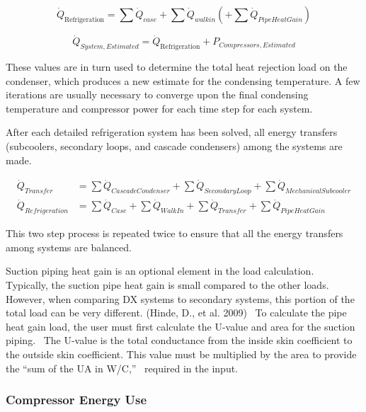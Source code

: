 \begin{equation}
{\dot Q_{{\mathrm{Refrigeration}}}} = \sum {{{\dot Q}_{case}}}  + \sum {{{\dot Q}_{walkin}}} ( + \sum {{{\dot Q}_{PipeHeatGain}}} )
\end{equation}

\begin{equation}
{\dot Q_{System,Estimated}} = {\dot Q_{{\mathrm{Refrigeration}}}} + {P_{Compressors,Estimated}}
\end{equation}

These values are in turn used to determine the total heat rejection load on the condenser, which produces a new estimate for the condensing temperature. A few iterations are usually necessary to converge upon the final condensing temperature and compressor power for each time step for each system.

After each detailed refrigeration system has been solved, all energy transfers (subcoolers, secondary loops, and cascade condensers) among the systems are made.

\begin{equation}
  \begin{array}{rl}
    \dot{Q}_{Transfer} &= \sum \dot{Q}_{CascadeCondenser} + \sum \dot{Q}_{SecondaryLoop} + \sum \dot{Q}_{MechanicalSubcooler} \\
    \dot{Q}_{Refrigeration} &= \sum \dot{Q}_{Case} + \sum \dot{Q}_{WalkIn} + \sum \dot{Q}_{Transfer} + \sum \dot{Q}_{PipeHeatGain}
  \end{array}
\end{equation}

This two step process is repeated twice to ensure that all the energy transfers among systems are balanced.

Suction piping heat gain is an optional element in the load calculation.~ Typically, the suction pipe heat gain is small compared to the other loads.~ However, when comparing DX systems to secondary systems, this portion of the total load can be very different. (Hinde, D., et al. 2009) ~To calculate the pipe heat gain load, the user must first calculate the U-value and area for the suction piping.~ The U-value is the total conductance from the inside skin coefficient to the outside skin coefficient. This value must be multiplied by the area to provide the ``sum of the UA in W/C,''~ required in the input.

\subsubsection{Compressor Energy Use}\label{compressor-energy-use-1}

